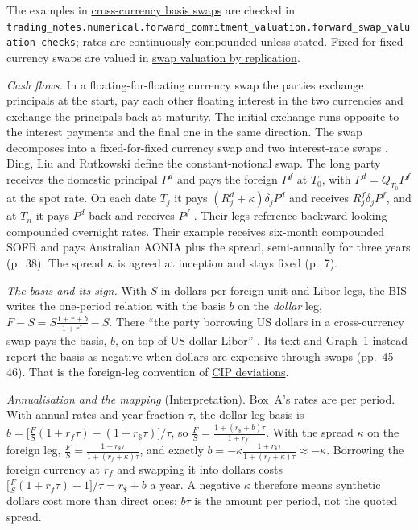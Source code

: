 The examples in \hyperref[meth:cross-currency-basis-swaps]{cross-currency basis swaps} are checked in \nolinkurl{trading_notes.numerical.forward_commitment_valuation.forward_swap_valuation_checks}; rates are continuously compounded unless stated. Fixed-for-fixed currency swaps are valued in \hyperref[meth:swap-valuation-replication]{swap valuation by replication}.

\begin{qfmethod}\label{meth:cross-currency-basis-swaps}
 \emph{Cash flows.} In a floating-for-floating currency swap the parties exchange principals at the start, pay each other floating interest in the two currencies and exchange the principals back at maturity. The initial exchange runs opposite to the interest payments and the final one in the same direction. The swap decomposes into a fixed-for-fixed currency swap and two interest-rate swaps \citep[chap.~7, sec.~7.10, pp.~192--193]{s7-hulloptions}. Ding, Liu and Rutkowski define the constant-notional swap. The long party receives the domestic principal $P^d$ and pays the foreign $P^f$ at $T_0$, with $P^d=Q_{T_0}P^f$ at the spot rate. On each date $T_j$ it pays $(R^d_j+\kappa)\delta_jP^d$ and receives $R^f_j\delta_jP^f$, and at $T_n$ it pays $P^d$ back and receives $P^f$ \citep[Definition~2.4, pp.~6--7]{ding-liu-rutkowski-ccbs-2025}. Their legs reference backward-looking compounded overnight rates. Their example receives six-month compounded SOFR and pays Australian AONIA plus the spread, semi-annually for three years (p.~38). The spread $\kappa$ is agreed at inception and stays fixed (p.~7).

\emph{The basis and its sign.} With $S$ in dollars per foreign unit and Libor legs, the BIS writes the one-period relation with the basis $b$ on the \emph{dollar} leg, $F-S=S\frac{1+r+b}{1+r^*}-S$. There ``the party borrowing US dollars in a cross-currency swap pays the basis, $b$, on top of US dollar Libor'' \citep[Box~A, p.~48]{cur-borio-mccauley-mcguire-sushko-2016}. Its text and Graph~1 instead report the basis as negative when dollars are expensive through swaps (pp.~45--46). That is the foreign-leg convention of \hyperref[ev:cip-deviations]{CIP deviations}.

\emph{Annualisation and the mapping} (Interpretation). Box~A's rates are per period. With annual rates and year fraction $\tau$, the dollar-leg basis is $b=\bigl[\frac FS(1+r_f\tau)-(1+r_{\$}\tau)\bigr]/\tau$, so $\frac FS=\frac{1+(r_{\$}+b)\tau}{1+r_f\tau}$. With the spread $\kappa$ on the foreign leg, $\frac FS=\frac{1+r_{\$}\tau}{1+(r_f+\kappa)\tau}$, and exactly $b=-\kappa\frac{1+r_{\$}\tau}{1+(r_f+\kappa)\tau}\approx-\kappa$. Borrowing the foreign currency at $r_f$ and swapping it into dollars costs $\bigl[\frac FS(1+r_f\tau)-1\bigr]/\tau=r_{\$}+b$ a year. A negative $\kappa$ therefore means synthetic dollars cost more than direct ones; $b\tau$ is the amount per period, not the quoted spread.


\end{qfmethod}
